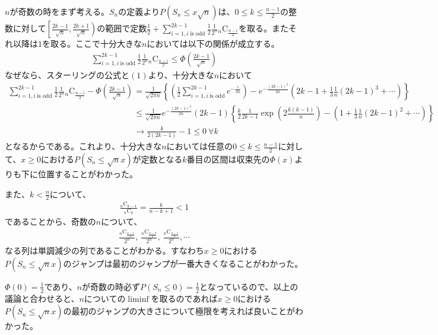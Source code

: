 \documentclass{article}
\begin{document}
$n$が奇数の時をまず考える。$S_n$の定義より$P\left( S_n \leq x \sqrt{n} \right)$は、$0\leq k \leq \frac{n-1}{2}$の整数に対して$\left[ \frac{2k-1}{\sqrt{n}}, \frac{2k+1}{\sqrt{n}} \right)$の範囲で定数$\frac{1}{2} + \sum_{i=1, i\ \text{is odd}}^{2k-1} \frac{1}{2} \frac{1}{2^n} {}_n \mathrm{C} _\frac{n-i}{2}$を取る。またそれ以降は$1$を取る。ここで十分大きな$n$においては以下の関係が成立する。
\begin{align*}
	\sum_{i=1, i\ \text{is odd}}^{2k-1} \frac{1}{2} \frac{1}{2^n} {}_n \mathrm{C} _\frac{n-i}{2} \leq \Phi \left(\frac{2k-1}{\sqrt{n}} \right)
\end{align*}
なぜなら、スターリングの公式と$(1)$より、十分大きな$n$において
\begin{align*}
	\sum_{i=1, i\ \text{is odd}}^{2k-1} \frac{1}{2} \frac{1}{2^n} {}_n \mathrm{C} _\frac{n-i}{2} - \Phi \left(\frac{2k-1}{\sqrt{n}} \right) &= \frac{1}{\sqrt{2\pi n}} \left\{ \left( \frac{1}{2} \sum_{i=1, i\ \text{is odd}}^{2k-1} e^{-\frac{i}{2n}}\right) - e^{- \frac{(2k-1)^2}{2n}} \left( 2k-1 + \frac{1}{3} \frac{1}{n} (2k-1)^3 + \cdots \right) \right\}\\[10pt]
	&\leq \frac{1}{\sqrt{2\pi n}} e^{- \frac{(2k-1)^2}{2n}} (2k-1) \left\{ \frac{k}{2} \frac{1}{2k-1}\exp \left(2 \frac{k(k-1)}{n}\right) - \left(1 + \frac{1}{3} \frac{1}{n} (2k-1)^2 + \cdots \right) \right\}\\[10pt]
	&\to \frac{k}{2(2k-1)} -1 \leq 0\ \forall k
\end{align*}
となるからである。これより、十分大きな$n$においては任意の$0\leq k \leq \frac{n-1}{2}$に対して、$x \geq 0$における$P\left( S_n \leq \sqrt{n} x \right)$が定数となる$k$番目の区間は収束先の$\Phi(x)$よりも下に位置することがわかった。

また、$k < \frac{n}{2}$について、
\begin{align}
	\frac{{}_n \mathrm{C} _{k-1}}{{}_n \mathrm{C} _{k}} = \frac{k}{n-k+1} < 1
\end{align}
であることから、奇数の$n$について、
\begin{align*}
	\frac{{}_n \mathrm{C} _\frac{n-1}{2}}{2^n},\ \frac{{}_n \mathrm{C} _\frac{n-3}{2}}{2^n},\ \frac{{}_n \mathrm{C} _\frac{n-5}{2}}{2^n}, \cdots
\end{align*}
なる列は単調減少の列であることがわかる。すなわち$x\geq 0$における$P\left( S_n \leq \sqrt{n} x \right)$のジャンプは最初のジャンプが一番大きくなることがわかった。

$\Phi(0) = \frac{1}{2}$であり、$n$が奇数の時必ず$P\left( S_n \leq 0 \right) = \frac{1}{2}$となっているので、以上の議論と合わせると、$n$についての$\liminf$を取るのであれば$x\geq0$における$P\left( S_n \leq \sqrt{n} x \right)$の最初のジャンプの大きさについて極限を考えれば良いことがわかった。
\end{document}

